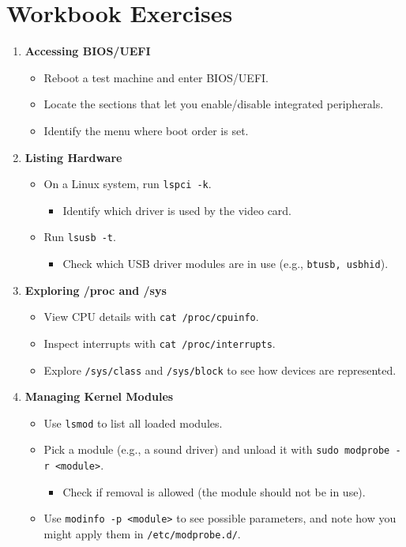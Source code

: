 \documentclass[12pt,a4paper]{report}
\begin{document}
\section*{Workbook Exercises}

\begin{enumerate}
    \item \textbf{Accessing BIOS/UEFI}
    \begin{itemize}
        \item Reboot a test machine and enter BIOS/UEFI.
        \item Locate the sections that let you enable/disable integrated peripherals.
        \item Identify the menu where boot order is set.
    \end{itemize}

    \item \textbf{Listing Hardware}
    \begin{itemize}
        \item On a Linux system, run \texttt{lspci -k}.
        \begin{itemize}
            \item Identify which driver is used by the video card.
        \end{itemize}
        \item Run \texttt{lsusb -t}.
        \begin{itemize}
            \item Check which USB driver modules are in use (e.g., \texttt{btusb, usbhid}).
        \end{itemize}
    \end{itemize}

    \item \textbf{Exploring /proc and /sys}
    \begin{itemize}
        \item View CPU details with \texttt{cat /proc/cpuinfo}.
        \item Inspect interrupts with \texttt{cat /proc/interrupts}.
        \item Explore \texttt{/sys/class} and \texttt{/sys/block} to see how devices are represented.
    \end{itemize}

    \item \textbf{Managing Kernel Modules}
    \begin{itemize}
        \item Use  \texttt{lsmod} to list all loaded modules.
        \item Pick a module (e.g., a sound driver) and unload it with \texttt{sudo modprobe -r <module>}.
        \begin{itemize}
            \item Check if removal is allowed (the module should not be in use).
        \end{itemize}
        \item Use \texttt{modinfo -p <module>} to see possible parameters, and note how you might apply them in \texttt{/etc/modprobe.d/}.
        

\end{itemize}
\end{enumerate}
\end{document}
